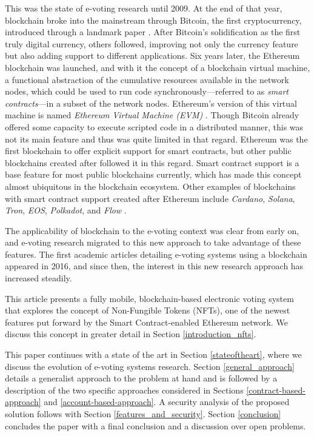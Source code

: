 \documentclass[../main.tex]{subfiles}
\begin{document}
\par
This was the state of e-voting research until 2009. At the end of that year, blockchain broke into the mainstream through Bitcoin, the first cryptocurrency, introduced through a landmark paper \cite{Nakamoto2008}. After Bitcoin's solidification as the first truly digital currency, others followed, improving not only the currency feature but also adding support to different applications. Six years later, the Ethereum blockchain \cite{Dannen2016} was launched, and with it the concept of a blockchain virtual machine, a functional abstraction of the cumulative resources available in the network nodes, which could be used to run code synchronously—referred to as \textit{smart contracts}—in a subset of the network nodes. Ethereum's version of this virtual machine is named \textit{Ethereum Virtual Machine (EVM)} \cite{Antonopoulos2018}. Though Bitcoin already offered some capacity to execute scripted code in a distributed manner, this was not its main feature and thus was quite limited in that regard. Ethereum was the first blockchain to offer explicit support for smart contracts, but other public blockchains created after followed it in this regard. Smart contract support is a base feature for most public blockchains currently, which has made this concept almost ubiquitous in the blockchain ecosystem. Other examples of blockchains with smart contract support created after Ethereum include \textit{Cardano}, \textit{Solana}, \textit{Tron}, \textit{EOS}, \textit{Polkadot}, and \textit{Flow} \cite{cointree2022}.
\par
The applicability of blockchain to the e-voting context was clear from early on, and e-voting research migrated to this new approach to take advantage of these features. The first academic articles detailing e-voting systems using a blockchain appeared in 2016, and since then, the interest in this new research approach has increased steadily.
\par
This article presents a fully mobile, blockchain-based electronic voting system that explores the concept of Non-Fungible Tokens (NFTs), one of the newest features put forward by the Smart Contract-enabled Ethereum network. We discuss this concept in greater detail in Section \ref{introduction_nfts}.
\par
This paper continues with a state of the art in Section \ref{stateoftheart}, where we discuss the evolution of e-voting systems research. Section \ref{general_approach} details a generalist approach to the problem at hand and is followed by a description of the two specific approaches considered in Sections \ref{contract-based-approach} and \ref{account-based-approach}. A security analysis of the proposed solution follows with Section \ref{features_and_security}. Section \ref{conclusion} concludes the paper with a final conclusion and a discussion over open problems.
\end{document}

